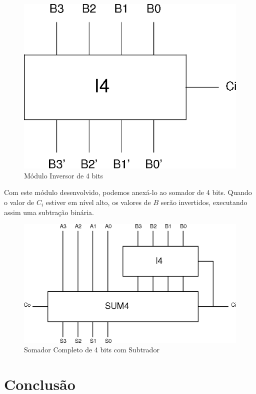 \documentclass{article}
\begin{document}
\begin{figure}
    \centering{}
    \includegraphics[scale=0.4]{sources/i4.png}
    \caption{Módulo Inversor de 4 bits}
    \label{fig:i4}
\end{figure}

Com este módulo desenvolvido, podemos anexá-lo ao somador de 4 bits. Quando o
valor de $C_i$ estiver em nível alto, os valores de $B$ serão invertidos,
executando assim uma subtração binária.

\begin{figure}
    \centering{}
    \includegraphics[scale=0.4]{sources/sumsub.png}
    \caption{Somador Completo de 4 bits com Subtrador}
    \label{fig:sumsub}
\end{figure}

\section{Conclusão}
\label{sec:conclusao}
\end{document}
